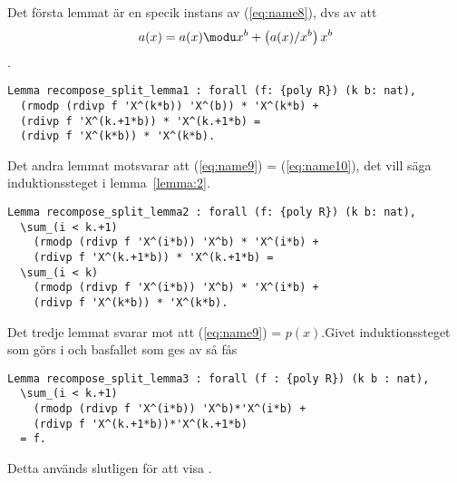Det första lemmat  är en specik instans av
(\ref{eq:name8}), dvs av att
\begin{align*}
  a(x) = a(x) \modu x^b + \left(a(x)/x^b\right) x^b
\end{align*}.
\begin{lstlisting}
Lemma recompose_split_lemma1 : forall (f: {poly R}) (k b: nat),
  (rmodp (rdivp f 'X^(k*b)) 'X^(b)) * 'X^(k*b) +
  (rdivp f 'X^(k.+1*b)) * 'X^(k.+1*b) =
  (rdivp f 'X^(k*b)) * 'X^(k*b).
\end{lstlisting}
Det andra lemmat motsvarar att (\ref{eq:name9}) = (\ref{eq:name10}), det vill
säga induktionssteget i lemma~\ref{lemma:2}.
\begin{lstlisting}
Lemma recompose_split_lemma2 : forall (f: {poly R}) (k b: nat),
  \sum_(i < k.+1)
    (rmodp (rdivp f 'X^(i*b)) 'X^b) * 'X^(i*b) +
    (rdivp f 'X^(k.+1*b)) * 'X^(k.+1*b) =
  \sum_(i < k)
    (rmodp (rdivp f 'X^(i*b)) 'X^b) * 'X^(i*b) +
    (rdivp f 'X^(k*b)) * 'X^(k*b).
\end{lstlisting}
Det tredje lemmat svarar mot att (\ref{eq:name9}) = $p(x)$.Givet
induktionssteget som görs i  och basfallet som ges av
 så fås
\begin{lstlisting}
Lemma recompose_split_lemma3 : forall (f : {poly R}) (k b : nat),
  \sum_(i < k.+1)
    (rmodp (rdivp f 'X^(i*b)) 'X^b)*'X^(i*b) +
    (rdivp f 'X^(k.+1*b))*'X^(k.+1*b)
  = f.
\end{lstlisting}
Detta används slutligen för att visa .

